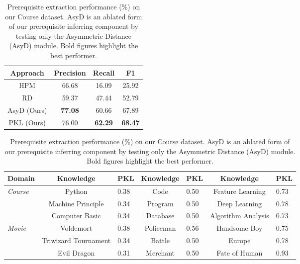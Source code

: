 \begin{table}
\setlength{\abovecaptionskip}{-0.3cm}
\parbox{.30\linewidth}{
    \setlength{\abovecaptionskip}{-0.2cm}
    \centering
    \footnotesize
    \begin{tabular}{c|ccc}
    \toprule
    Approach & Precision & Recall & F1 \\ \midrule
    HPM & 66.68 & 16.09 & 25.92 \\
    RD & 59.37 & 47.44 & 52.79 \\
    AsyD (Ours) & \textbf{77.08} & 60.66 & 67.89 \\
    PKL (Ours) & 76.00 & \textbf{62.29} & \textbf{68.47} \\
    \bottomrule
    \end{tabular}
    \caption{Prerequisite extraction performance (\%) on our Course dataset. AsyD is an ablated form of our prerequisite inferring component by testing only the Asymmetric Distance (AsyD) module. Bold figures highlight the best performer.}
    \label{tab:KPL}
}
\hfill
\parbox{.65\linewidth}{
    \footnotesize
    \begin{tabular}{c|cl|cl|cl}
    \hline
    Domain & Knowledge           & \multicolumn{1}{c|}{PKL} & Knowledge                & \multicolumn{1}{c|}{PKL} & Knowledge            & \multicolumn{1}{c}{PKL} \\ \hline
    \multicolumn{1}{l|}{\multirow{3}{*}{\textit{Course}}} & Python            & 0.38                     & Code                   & 0.50                     & Feature Learning   & 0.73                    \\
    & Machine Principle & 0.34                     & Program                & 0.50                     & Deep Learning      & 0.78                    \\
    & Computer Basic    & 0.34                     & Database               & 0.50                     & Algorithm Analysis & 0.73                    \\ \hline
    
     
    \multicolumn{1}{l|}{\multirow{3}{*}{\textit{Movie}}} & Voldemort  & 0.38   & Policeman            & 0.56             &  Handsome Boy  & 0.75                    \\
    & Triwizard Tournament & 0.34        &  Battle              & 0.50                     & Europe     & 0.78                    \\
    & Evil Dragon & 0.31         &       Merchant         & 0.50       & Fate of Human & 0.93                    \\ \hline
    

\end{tabular}}
\end{table}
